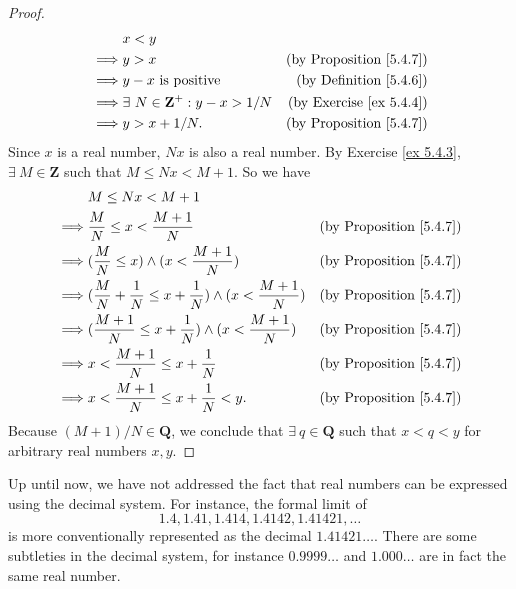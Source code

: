 \begin{proof}
\begin{align*}
& x < y \\
\implies & y > x & \text{(by Proposition \ref{5.4.7})} \\
\implies & y - x \text{ is positive} & \text{(by Definition \ref{5.4.6})} \\
\implies & \exists\ N \in \mathbf{Z}^+ : y - x > 1 / N & \text{(by Exercise \ref{ex 5.4.4})} \\
\implies & y > x + 1 / N. & \text{(by Proposition \ref{5.4.7})} \\
\end{align*}
Since \(x\) is a real number, \(Nx\) is also a real number.
By Exercise \ref{ex 5.4.3}, \(\exists\ M \in \mathbf{Z}\) such that \(M \leq Nx < M + 1\).
So we have
\begin{align*}
& M \leq Nx < M + 1 \\
\implies & \frac{M}{N} \leq x < \frac{M + 1}{N} & \text{(by Proposition \ref{5.4.7})} \\
\implies & (\frac{M}{N} \leq x) \land (x < \frac{M + 1}{N}) & \text{(by Proposition \ref{5.4.7})} \\
\implies & (\frac{M}{N} + \frac{1}{N} \leq x + \frac{1}{N}) \land (x < \frac{M + 1}{N}) & \text{(by Proposition \ref{5.4.7})} \\
\implies & (\frac{M + 1}{N} \leq x + \frac{1}{N}) \land (x < \frac{M + 1}{N}) & \text{(by Proposition \ref{5.4.7})} \\
\implies & x < \frac{M + 1}{N} \leq x + \frac{1}{N} & \text{(by Proposition \ref{5.4.7})} \\
\implies & x < \frac{M + 1}{N} \leq x + \frac{1}{N} < y. & \text{(by Proposition \ref{5.4.7})}
\end{align*}
Because \((M + 1) / N \in \mathbf{Q}\), we conclude that \(\exists\ q \in \mathbf{Q}\) such that \(x < q < y\) for arbitrary real numbers \(x, y\).
\end{proof}

\begin{remark}\label{5.4.15}
Up until now, we have not addressed the fact that real numbers can be expressed using the decimal system.
For instance, the formal limit of
\[
    1.4, 1.41, 1.414, 1.4142, 1.41421, \dots
\]
is more conventionally represented as the decimal \(1.41421\dots\).
There are some subtleties in the decimal system, for instance \(0.9999\dots\) and \(1.000\dots\) are in fact the same real number.
\end{remark}


